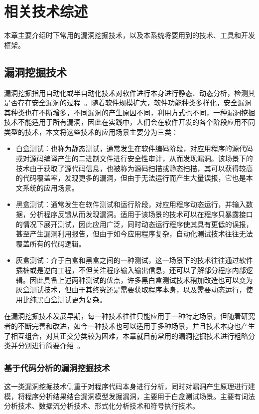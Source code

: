 \chapter{相关技术综述}
本章主要介绍时下常用的漏洞挖掘技术，以及本系统将要用到的技术、工具和开发框架。

\section{漏洞挖掘技术}
漏洞挖掘指用自动化或半自动化技术对软件进行本身进行静态、动态分析，检测其是否存在安全漏洞的过程~\cite{liujian2018}。随着软件规模扩大，软件功能种类多样化，安全漏洞其种类也在不断增多，不同漏洞的产生原因不同，利用方式也不同，一种漏洞挖掘技术不能适用于所有漏洞，因此在实践中，人们会在软件开发的各个阶段应用不同类型的技术，本文将这些技术的应用场景主要分为三类：
\begin{itemize}
    \item  白盒测试：也称为静态测试，通常发生在软件编码阶段，对应用程序的源代码或对源码编译产生的二进制文件进行安全性审计，从而发现漏洞。该场景下的技术由于获取了源代码信息，也被称为源码扫描或静态扫描，其可以获得较高的代码覆盖率，发现更多的漏洞，但由于无法运行而产生大量误报，它也是本文系统的应用场景。
    \item 黑盒测试：通常发生在软件测试和运行阶段，对应用程序动态运行，并输入数据，分析程序反馈从而发现漏洞。适用于该场景的技术可以在程序只暴露接口的情况下展开测试，因此应用广泛，同时动态运行程序使其具有更低的误报，甚至产生漏洞利用报告，但由于如今应用程序复杂，自动化测试技术往往无法覆盖所有的代码逻辑。
    \item 灰盒测试：介于白盒和黑盒之间的一种测试，这一场景下的技术往往通过软件插桩或是逆向工程，不但关注程序输入输出信息，还可以了解部分程序内部逻辑。因此具备上述两种测试的优点，许多黑白盒测试技术稍加改造也可以变为灰盒测试技术，但由于其终究还是需要获取程序本身，以及需要动态运行，使用比纯黑白盒测试更为复杂。
\end{itemize}

在漏洞挖掘技术发展早期，每一种技术往往只能应用于一种特定场景，但随着研究者的不断完善和改进，如今一种技术也可以适用于多种场景，并且技术本身也产生了相互组合，对其正交分类较为困难，本章就目前常用的漏洞挖掘技术进行粗略分类并分别进行简要介绍~\cite{liujian2018,meihong2009}。


\subsection{基于代码分析的漏洞挖掘技术}
这一类漏洞挖掘技术侧重于对程序代码本身进行分析，同时对漏洞产生原理进行建模，将程序分析结果结合漏洞模型发掘漏洞，主要用于白盒测试场景。主要有词法分析技术、数据流分析技术、形式化分析技术和符号执行技术。

